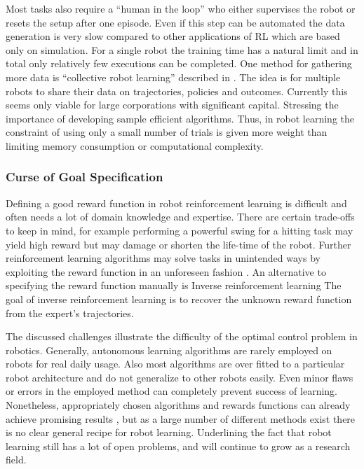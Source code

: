Most tasks also require a ``human in the loop'' who either
supervises the robot
or resets the setup after one episode. Even if this step
can be automated the data generation is very slow
compared to other applications of RL which are based only on simulation.
For a single robot the training time has a natural limit
and in total only relatively few executions can be completed.
One method for gathering more data is ``collective robot learning''
described in
\citet{kehoe2015survey}. The idea is for multiple robots to
share their data on trajectories, policies and outcomes.
Currently this seems only
viable for large corporations with significant capital.
Stressing the importance of developing sample efficient algorithms.
Thus, in robot learning the constraint of using only a small number of trials
is given more weight than limiting memory consumption or
computational complexity.


\subsubsection{Curse of Goal Specification}
Defining a good reward function in robot reinforcement learning is
difficult and often needs a lot of domain knowledge and expertise.
There are certain trade-offs to keep in mind, for example performing
a powerful swing for a hitting task may yield high reward but may damage
or shorten the life-time of the robot.
Further reinforcement learning algorithms may solve tasks
in unintended ways by exploiting the reward function in an unforeseen fashion
\citep{ng1999policy}.
An alternative to specifying the reward function manually
is Inverse reinforcement learning \citep{russell1998learning}
The goal of inverse reinforcement learning is to recover the unknown
reward function from the expert's trajectories.


$$~$$
The discussed challenges illustrate the difficulty of the optimal control
problem in robotics.
Generally, autonomous learning algorithms are rarely employed on robots
for real daily usage. Also most
algorithms are over fitted to a particular robot architecture
and do not generalize to other robots easily.
Even minor flaws or errors in the employed method can completely prevent
success of learning.
Nonetheless, appropriately chosen algorithms and rewards functions
can already achieve promising results \citep{kober2013reinforcement}, but as 
a large number of different methods exist 
there is no clear general recipe for robot learning.
Underlining the fact that robot learning still has a lot of open problems,
and will continue to grow as a research field.

